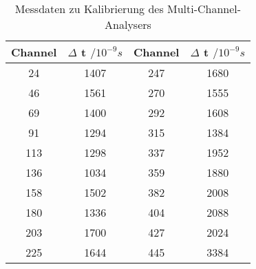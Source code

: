 \begin{table}[h!]
  \centering
  \caption{Messdaten zu Kalibrierung des Multi-Channel-Analysers}
  \label{tab:kalibrierung}
  \begin{tabular}{c c c c}
    \toprule
      Channel & $\Delta$ t $/ 10^{-9} s$ & Channel & $\Delta$ t $/ 10^{-9} s$ \\
      \midrule
         24   &   1407  &  247   &   1680 \\
         46   &   1561  &  270   &   1555 \\
         69   &   1400  &  292   &   1608 \\
         91   &   1294  &  315   &   1384 \\
        113   &   1298  &  337   &   1952 \\
        136   &   1034  &  359   &   1880 \\
        158   &   1502  &  382   &   2008 \\
        180   &   1336  &  404   &   2088 \\
        203   &   1700  &  427   &   2024 \\
        225   &   1644  &  445   &   3384 \\
    \bottomrule
  \end{tabular}
\end{table}

%
